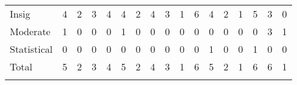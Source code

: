 \begin{tabular}{lcccccccccccccccc}
\hline \noalign{\smallskip}Insig & 4 & 2 & 3 & 4 & 4 & 2 & 4 & 3 & 1 & 6 & 4 & 2 & 1 & 5 & 3 & 0\\
Moderate & 1 & 0 & 0 & 0 & 1 & 0 & 0 & 0 & 0 & 0 & 0 & 0 & 0 & 0 & 3 & 1\\
Statistical & 0 & 0 & 0 & 0 & 0 & 0 & 0 & 0 & 0 & 0 & 1 & 0 & 0 & 1 & 0 & 0\\
Total & 5 & 2 & 3 & 4 & 5 & 2 & 4 & 3 & 1 & 6 & 5 & 2 & 1 & 6 & 6 & 1\\
\noalign{\smallskip}\hline\end{tabular}\\
